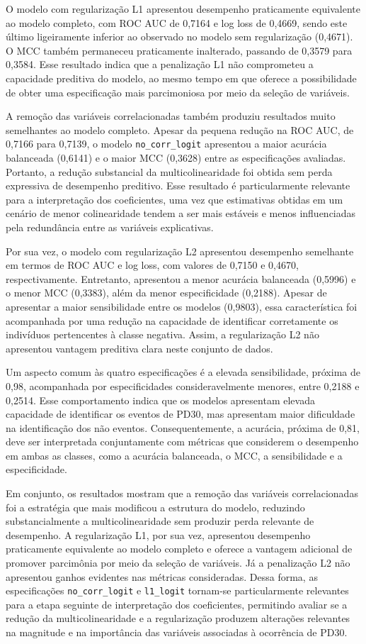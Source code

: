 \documentclass[
  brazilian,
  12pt,
  letterpaper,
  DIV=11,
  numbers=noendperiod]{scrartcl}
\begin{document}
O modelo com regularização L1 apresentou desempenho praticamente
equivalente ao modelo completo, com ROC AUC de 0,7164 e log loss de
0,4669, sendo este último ligeiramente inferior ao observado no modelo
sem regularização (0,4671). O MCC também permaneceu praticamente
inalterado, passando de 0,3579 para 0,3584. Esse resultado indica que a
penalização L1 não comprometeu a capacidade preditiva do modelo, ao
mesmo tempo em que oferece a possibilidade de obter uma especificação
mais parcimoniosa por meio da seleção de variáveis.

A remoção das variáveis correlacionadas também produziu resultados muito
semelhantes ao modelo completo. Apesar da pequena redução na ROC AUC, de
0,7166 para 0,7139, o modelo \texttt{no\_corr\_logit} apresentou a maior
acurácia balanceada (0,6141) e o maior MCC (0,3628) entre as
especificações avaliadas. Portanto, a redução substancial da
multicolinearidade foi obtida sem perda expressiva de desempenho
preditivo. Esse resultado é particularmente relevante para a
interpretação dos coeficientes, uma vez que estimativas obtidas em um
cenário de menor colinearidade tendem a ser mais estáveis e menos
influenciadas pela redundância entre as variáveis explicativas.

Por sua vez, o modelo com regularização L2 apresentou desempenho
semelhante em termos de ROC AUC e log loss, com valores de 0,7150 e
0,4670, respectivamente. Entretanto, apresentou a menor acurácia
balanceada (0,5996) e o menor MCC (0,3383), além da menor especificidade
(0,2188). Apesar de apresentar a maior sensibilidade entre os modelos
(0,9803), essa característica foi acompanhada por uma redução na
capacidade de identificar corretamente os indivíduos pertencentes à
classe negativa. Assim, a regularização L2 não apresentou vantagem
preditiva clara neste conjunto de dados.

Um aspecto comum às quatro especificações é a elevada sensibilidade,
próxima de 0,98, acompanhada por especificidades consideravelmente
menores, entre 0,2188 e 0,2514. Esse comportamento indica que os modelos
apresentam elevada capacidade de identificar os eventos de PD30, mas
apresentam maior dificuldade na identificação dos não eventos.
Consequentemente, a acurácia, próxima de 0,81, deve ser interpretada
conjuntamente com métricas que considerem o desempenho em ambas as
classes, como a acurácia balanceada, o MCC, a sensibilidade e a
especificidade.

Em conjunto, os resultados mostram que a remoção das variáveis
correlacionadas foi a estratégia que mais modificou a estrutura do
modelo, reduzindo substancialmente a multicolinearidade sem produzir
perda relevante de desempenho. A regularização L1, por sua vez,
apresentou desempenho praticamente equivalente ao modelo completo e
oferece a vantagem adicional de promover parcimônia por meio da seleção
de variáveis. Já a penalização L2 não apresentou ganhos evidentes nas
métricas consideradas. Dessa forma, as especificações
\texttt{no\_corr\_logit} e \texttt{l1\_logit} tornam-se particularmente
relevantes para a etapa seguinte de interpretação dos coeficientes,
permitindo avaliar se a redução da multicolinearidade e a regularização
produzem alterações relevantes na magnitude e na importância das
variáveis associadas à ocorrência de PD30.
\end{document}
